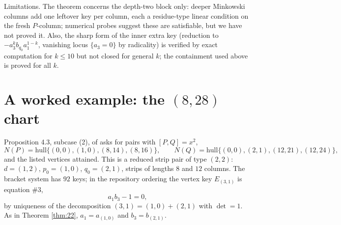 \documentclass[11pt]{article}
\theoremstyle{definition}
\theoremstyle{remark}
\begin{document}
Limitations. The theorem concerns the depth-two block only: deeper Minkowski columns add one leftover key per column, each a residue-type linear condition on the fresh $P$-column; numerical probes suggest these are satisfiable, but we have not proved it. Also, the sharp form of the inner extra key (reduction to $-a_3^k b_{q_0}a_1^{1-k}$, vanishing locus $\{a_3=0\}$ by radicality) is verified by exact computation for $k\leq10$ but not closed for general $k$; the containment used above is proved for all $k$.

\section{A worked example: the $(8,28)$ chart}\label{sec:example}

Proposition 4.3, subcase (2), of \cite{GGHV} asks for pairs with $[P,Q]=x^2$,
\[
N(P)=\mathrm{hull}\{(0,0),(1,0),(8,14),(8,16)\},\qquad
N(Q)=\mathrm{hull}\{(0,0),(2,1),(12,21),(12,24)\},
\]
and the listed vertices attained. This is a reduced strip pair of type $(2,2)$: $d=(1,2)$, $p_0=(1,0)$, $q_0=(2,1)$, strips of lengths $8$ and $12$ columns. The bracket system has $92$ keys; in the repository ordering the vertex key $E_{(3,1)}$ is equation $\#3$,
\[
a_1b_3-1=0,
\]
by uniqueness of the decomposition $(3,1)=(1,0)+(2,1)$ with $\det=1$. As in Theorem \ref{thm:22}, $a_1=a_{(1,0)}$ and $b_3=b_{(2,1)}$.
\end{document}

